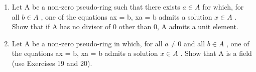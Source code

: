 \begin{enumerate}
\def\labelenumi{\arabic{enumi}.}
\setcounter{enumi}{19}
\item
  Let A be a non-zero pseudo-ring such that there exists \(a \in A\) for which, for all \(b \in A\) , one of the equations ax = b, xa = b admits a solution \(x \in A\) . Show that if A has no divisor of 0 other than 0, A admits a unit element.
\item
  Let A be a non-zero pseudo-ring in which, for all \(a \neq 0\) and all \(b \in A\) , one of the equations ax = b, xa = b admits a solution \(x \in A\) . Show that A is a field (use Exercises 19 and 20).
\end{enumerate}

